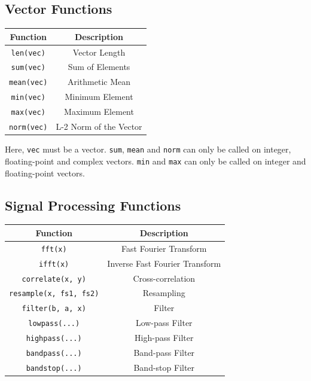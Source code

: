 \subsection{Vector Functions}
\begin{table}[H]
    \centering
    \begin{tabular}{|c|c|}
        \hline
        \textbf{Function} & \textbf{Description} \\
        \hline
        \texttt{len(vec)} & Vector Length \\
        \texttt{sum(vec)} & Sum of Elements \\
        \texttt{mean(vec)} & Arithmetic Mean \\
        \texttt{min(vec)} & Minimum Element \\
        \texttt{max(vec)} & Maximum Element \\
        \texttt{norm(vec)} & L-2 Norm of the Vector \\
        \hline
    \end{tabular}
\end{table}
Here, \texttt{vec} must be a vector. \texttt{sum}, \texttt{mean} and \texttt{norm} can only be called on integer, floating-point and complex vectors. \texttt{min} and \texttt{max} can only be called on integer and floating-point vectors.

\subsection{Signal Processing Functions}
\begin{table}[H]
    \centering
    \begin{tabular}{|c|c|}
        \hline
        \textbf{Function} & \textbf{Description} \\
        \hline
        \texttt{fft(x)} & Fast Fourier Transform \\
        \texttt{ifft(x)} & Inverse Fast Fourier Transform \\
        \texttt{correlate(x, y)} & Cross-correlation \\
        \texttt{resample(x, fs1, fs2)} & Resampling \\
        \texttt{filter(b, a, x)} & Filter \\
        \texttt{lowpass(...)} & Low-pass Filter \\
        \texttt{highpass(...)} & High-pass Filter \\
        \texttt{bandpass(...)} & Band-pass Filter \\
        \texttt{bandstop(...)} & Band-stop Filter \\
        \hline
    \end{tabular}
\end{table}

